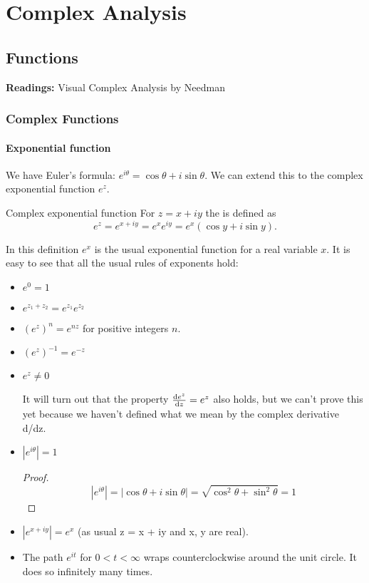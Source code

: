 \part{Complex Analysis}
\chapter{Functions}
\textbf{Readings:} Visual Complex Analysis by Needman

\section{Complex Functions}
\subsection{Exponential function}
We have Euler's formula: $e^{i\theta} = \cos\theta + i\sin\theta$. We can extend this to the complex exponential function $e^z$.

\begin{defn}{Complex exponential function}{}
For $z=x+iy$ the  is defined as
\[ e^z = e^{x+iy} = e^xe^{iy} = e^x(\cos y + i\sin y). \]
\end{defn}

In this definition $e^x$ is the usual exponential function for a real variable $x$. It is easy to see that all the usual rules of exponents hold:
\begin{itemize}
\item $e^0 = 1$

\item $e^{z_1+z_2} = e^{z_1} e^{z_2}$

\item $(e^z)^n = e^{nz}$ for positive integers $n$.

\item $(e^z)^{-1} = e^{-z}$

\item $e^z \neq 0$

It will turn out that the property $\dv{e^z}{z}=e^z$ also holds, but we can't prove this yet because we haven't defined what we mean by the complex derivative d/dz. 

\item $|e^{i\theta}| = 1$
\begin{proof}
\[ |e^{i\theta}| = |\cos\theta+i\sin\theta| = \sqrt{\cos^2\theta+\sin^2\theta} = 1 \]
\end{proof}

\item $|e^{x+iy}| = e^x$
(as usual z = x + iy and x, y are real).

\item The path $e^{it}$ for $0<t<\infty$ wraps counterclockwise around the unit circle. It does so infinitely many times.
\end{itemize}

